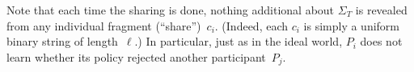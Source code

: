 \documentclass[10pt]{sigplanconf}
\newcommand{\mwh}[1]{\textcolor{purple}{MWH -- #1}}
\newcommand{\pxm}[1]{\textcolor{red}{PM -- #1}}
\newcommand{\mwh}[1]{}
\newcommand{\pxm}[1]{}
\begin{document}

Note that each time the sharing is done, nothing additional about $\Sigma_T$ is revealed from
any individual fragment (``share'')~$c_i$. (Indeed, each $c_i$ is simply a uniform binary string of length~$\ell$.)
In particular, just as in the ideal world, $P_i$
does not learn whether its policy rejected another participant~$P_j$.



\end{document}
